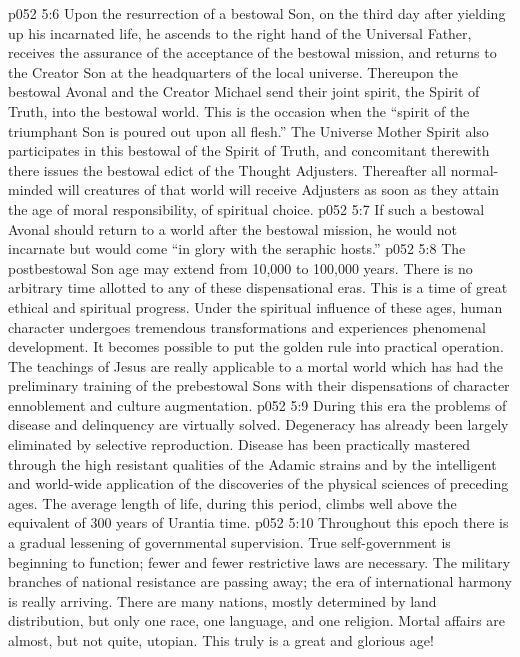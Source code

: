 \vs p052 5:6 \pc Upon the resurrection of a bestowal Son, on the third day after yielding up his incarnated life, he ascends to the right hand of the Universal Father, receives the assurance of the acceptance of the bestowal mission, and returns to the Creator Son at the headquarters of the local universe. Thereupon the bestowal Avonal and the Creator Michael send their joint spirit, the Spirit of Truth, into the bestowal world. This is the occasion when the “spirit of the triumphant Son is poured out upon all flesh.” The Universe Mother Spirit also participates in this bestowal of the Spirit of Truth, and concomitant therewith there issues the bestowal edict of the Thought Adjusters. Thereafter all normal\hyp{}minded will creatures of that world will receive Adjusters as soon as they attain the age of moral responsibility, of spiritual choice.
\vs p052 5:7 If such a bestowal Avonal should return to a world after the bestowal mission, he would not incarnate but would come “in glory with the seraphic hosts.”
\vs p052 5:8 \pc The postbestowal Son age may extend from 10,000 to 100,000 years. There is no arbitrary time allotted to any of these dispensational eras. This is a time of great ethical and spiritual progress. Under the spiritual influence of these ages, human character undergoes tremendous transformations and experiences phenomenal development. It becomes possible to put the golden rule into practical operation. The teachings of Jesus are really applicable to a mortal world which has had the preliminary training of the prebestowal Sons with their dispensations of character ennoblement and culture augmentation.
\vs p052 5:9 During this era the problems of disease and delinquency are virtually solved. Degeneracy has already been largely eliminated by selective reproduction. Disease has been practically mastered through the high resistant qualities of the Adamic strains and by the intelligent and world\hyp{}wide application of the discoveries of the physical sciences of preceding ages. The average length of life, during this period, climbs well above the equivalent of 300 years of Urantia time.
\vs p052 5:10 Throughout this epoch there is a gradual lessening of governmental supervision. True self\hyp{}government is beginning to function; fewer and fewer restrictive laws are necessary. The military branches of national resistance are passing away; the era of international harmony is really arriving. There are many nations, mostly determined by land distribution, but only one race, one language, and one religion. Mortal affairs are almost, but not quite, utopian. This truly is a great and glorious age!

